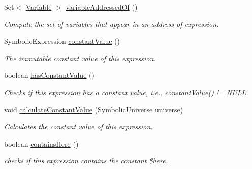 \begin{DoxyCompactItemize}
Set$<$ \hyperlink{interfaceedu_1_1udel_1_1cis_1_1vsl_1_1civl_1_1model_1_1IF_1_1variable_1_1Variable}{Variable} $>$ \hyperlink{interfaceedu_1_1udel_1_1cis_1_1vsl_1_1civl_1_1model_1_1IF_1_1expression_1_1Expression_ac2ad0236534bec54b91ee78ff658cbe0}{variable\+Addressed\+Of} ()
\begin{DoxyCompactList}\small\item\em Compute the set of variables that appear in an address-\/of expression. \end{DoxyCompactList}\item 
Symbolic\+Expression \hyperlink{interfaceedu_1_1udel_1_1cis_1_1vsl_1_1civl_1_1model_1_1IF_1_1expression_1_1Expression_a41883628a0b1c461778950049fa938c2}{constant\+Value} ()
\begin{DoxyCompactList}\small\item\em The immutable constant value of this expression. \end{DoxyCompactList}\item 
boolean \hyperlink{interfaceedu_1_1udel_1_1cis_1_1vsl_1_1civl_1_1model_1_1IF_1_1expression_1_1Expression_a6b85993cfec92cefa257c9bf77f48f28}{has\+Constant\+Value} ()
\begin{DoxyCompactList}\small\item\em Checks if this expression has a constant value, i.\+e., \hyperlink{interfaceedu_1_1udel_1_1cis_1_1vsl_1_1civl_1_1model_1_1IF_1_1expression_1_1Expression_a41883628a0b1c461778950049fa938c2}{constant\+Value()} != N\+U\+L\+L. \end{DoxyCompactList}\item 
void \hyperlink{interfaceedu_1_1udel_1_1cis_1_1vsl_1_1civl_1_1model_1_1IF_1_1expression_1_1Expression_a758a2937ae707707ca8caee4a0a0309e}{calculate\+Constant\+Value} (Symbolic\+Universe universe)
\begin{DoxyCompactList}\small\item\em Calculates the constant value of this expression. \end{DoxyCompactList}\item 
boolean \hyperlink{interfaceedu_1_1udel_1_1cis_1_1vsl_1_1civl_1_1model_1_1IF_1_1expression_1_1Expression_aec9a7fe7f8d44b4aa62a7fedf98e3096}{contains\+Here} ()
\begin{DoxyCompactList}\small\item\em checks if this expression contains the constant \$here. \end{DoxyCompactList}\end{DoxyCompactItemize}


